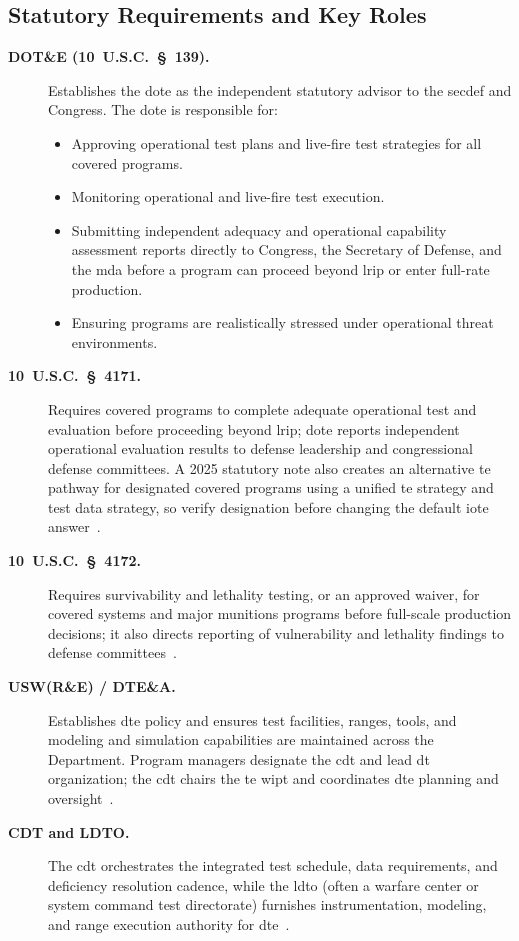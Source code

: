 \documentclass[../main.tex]{subfiles}
\begin{document}
\subsection{Statutory Requirements and Key Roles}
\begin{description}
  \item[\textbf{DOT\&E (10~U.S.C.~\S~139).}] Establishes the \ac{dote} as the independent statutory advisor to the \ac{secdef} and Congress. The \ac{dote} is responsible for:
    \begin{itemize}
      \item Approving operational test plans and live-fire test strategies for all covered programs.
      \item Monitoring operational and live-fire test execution.
      \item Submitting independent adequacy and operational capability assessment reports directly to Congress, the Secretary of Defense, and the \ac{mda} before a program can proceed beyond \ac{lrip} or enter full-rate production.
      \item Ensuring programs are realistically stressed under operational threat environments.
    \end{itemize}
  \item[\textbf{10~U.S.C.~\S~4171.}] Requires covered programs to complete adequate operational test and evaluation before proceeding beyond \ac{lrip}; \ac{dote} reports independent operational evaluation results to defense leadership and congressional defense committees. A 2025 statutory note also creates an alternative \ac{te} pathway for designated covered programs using a unified \ac{te} strategy and test data strategy, so verify designation before changing the default \ac{iote} answer~\autocite{USC-10-4171}.
  \item[\textbf{10~U.S.C.~\S~4172.}] Requires survivability and lethality testing, or an approved waiver, for covered systems and major munitions programs before full-scale production decisions; it also directs reporting of vulnerability and lethality findings to defense committees~\autocite{USC-10-4172}.
  \item[\textbf{USW(R\&E) / DTE\&A.}] Establishes \ac{dte} policy and ensures test facilities, ranges, tools, and modeling and simulation capabilities are maintained across the Department. Program managers designate the \ac{cdt} and lead \ac{dt} organization; the \ac{cdt} chairs the \ac{te} \ac{wipt} and coordinates \ac{dte} planning and oversight~\autocite{DoDI5000-89,ASW-MC-official-2026}.
  \item[\textbf{CDT and LDTO.}] The \ac{cdt} orchestrates the integrated test schedule, data requirements, and deficiency resolution cadence, while the \ac{ldto} (often a warfare center or system command test directorate) furnishes instrumentation, modeling, and range execution authority for \ac{dte}~\autocite{DoDI5000-89}.

\end{description}
\end{document}
